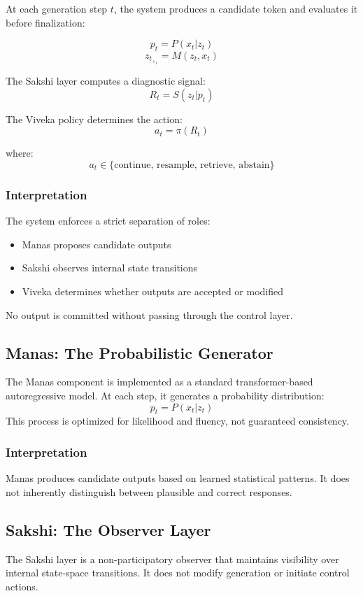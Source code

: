 \documentclass[12pt,a4paper]{article}
\begin{document}
At each generation step $t$, the system produces a candidate token and evaluates it before finalization:

\[
p_t = P(x_t|z_t)
\]
\[
z_t_+_1=M(z_t,x_t)
\]

The Sakshi layer computes a diagnostic signal:
\[
R_t = S(z_t|p_t)
\]

The Viveka policy determines the action:
\[
a_t = \pi(R_t)
\]

where:
\[
a_t \in \{\text{continue, resample, retrieve, abstain}\}
\]

\newpage \subsubsection *{Interpretation}
The system enforces a strict separation of roles:
\begin{itemize}
\item Manas proposes candidate outputs
\item Sakshi observes internal state transitions
\item Viveka determines whether outputs are accepted or modified
\end{itemize}

No output is committed without passing through the control layer.

\subsection{Manas: The Probabilistic Generator}
The Manas component is implemented as a standard transformer-based autoregressive model. At each step, it generates a probability distribution:
\[
p_t = P(x_t|z_t)
\]
This process is optimized for likelihood and fluency, not guaranteed consistency.

\subsubsection *{Interpretation}
Manas produces candidate outputs based on learned statistical patterns. It does not inherently distinguish between plausible and correct responses.

\subsection{Sakshi: The Observer Layer}
The Sakshi layer is a non-participatory observer that maintains visibility over internal state-space transitions. It does not modify generation or initiate control actions.
\end{document}
